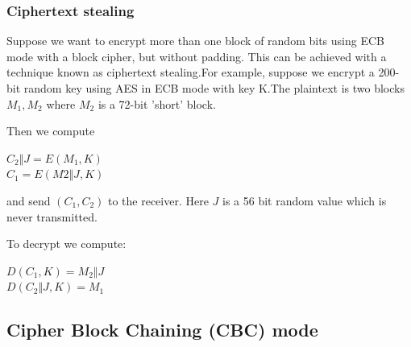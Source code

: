 \documentclass{article}
\begin{document}
\subsubsection{Ciphertext stealing}

Suppose we want to encrypt more than one block of random bits using ECB mode with a block cipher, but without padding. This can be achieved with a technique known as ciphertext stealing.For example, suppose we encrypt a 200-bit random key using AES in ECB mode with key K.The plaintext is two blocks $M_1, M_2$ where $M_2$ is a 72-bit 'short' block.

Then we compute
\begin{center}
    $C_2 \Vert J = E(M_1, K)$\\
    $C_1 = E(M2 \Vert J, K)$
\end{center}
and send $(C_1, C_2)$ to the receiver. Here $J$ is a 56 bit random value which is never transmitted.

To decrypt we compute:
\begin{center}
    $D(C_1, K) = M_2 \Vert J$\\
    $D(C_2 \Vert J, K) = M_1$
\end{center}

\subsection{Cipher Block Chaining (CBC) mode}
\end{document}
